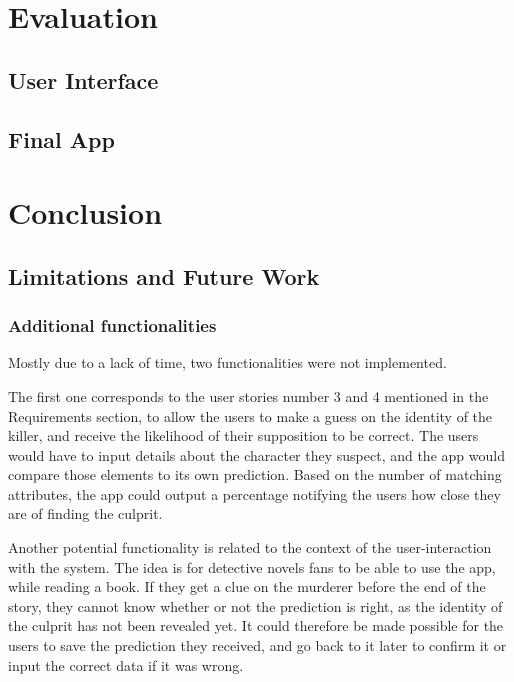 \documentclass{mproj}
\begin{document}
\chapter{Evaluation}

\section{User Interface}

\section{Final App}

\chapter{Conclusion}\label{conclusion}

\section{Limitations and Future Work}

\subsection{Additional functionalities}

\hspace{5mm} Mostly due to a lack of time, two functionalities were not implemented.\par

The first one corresponds to the user stories number 3 and 4 mentioned in the Requirements section, to allow the users to make a guess on the identity of the killer, and receive the likelihood of their supposition to be correct. The users would have to input details about the character they suspect, and the app would compare those elements to its own prediction. Based on the number of matching attributes, the app could output a percentage notifying the users how close they are of finding the culprit. \par

Another potential functionality is related to the context of the user-interaction with the system. The idea is for detective novels fans to be able to use the app, while reading a book. If they get a clue on the murderer before the end of the story, they cannot know whether or not the prediction is right, as the identity of the culprit has not been revealed yet. It could therefore be made possible for the users to save the prediction they received, and go back to it later to confirm it or input the correct data if it was wrong.
\end{document}
